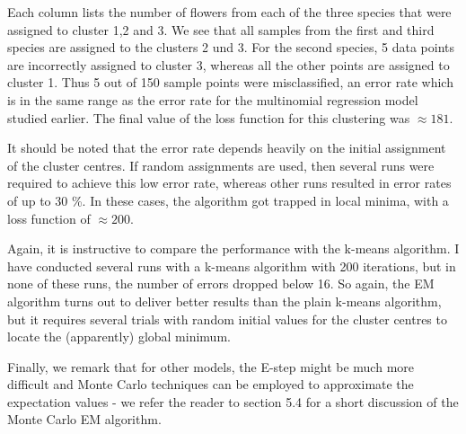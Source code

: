\documentclass[a4paper, draft]{article}
\theoremstyle{own}
\theoremstyle{remark}
\begin{document}
Each column lists the number of flowers from each of the three species that were assigned to cluster 1,2 and 3. We see that all samples from the first and third species are assigned to the clusters 2 und 3. For the second species, 5 data points are incorrectly assigned to cluster 3, whereas all the other points are assigned to cluster 1. Thus 5 out of 150 sample points were misclassified, an error rate which is in the same range as the error rate for the multinomial regression model studied earlier. The final value of the loss function for this clustering was $\approx 181$.

It should be noted that the error rate depends heavily on the initial assignment of the cluster centres. If random assignments are used, then several runs were required to achieve this low error rate, whereas other runs resulted in error rates of up to 30 \%. In these cases, the algorithm got trapped in local minima, with a loss function of $\approx 200$.

Again, it is instructive to compare the performance with the k-means algorithm. I have conducted several runs with a k-means algorithm with 200 iterations, but in none of these runs, the number of errors dropped below 16. So again, the EM algorithm turns out to deliver better results than the plain k-means algorithm, but it requires several trials with random initial values for the cluster centres to locate the (apparently) global minimum. 

Finally, we remark that for other models, the E-step might be much more difficult and Monte Carlo techniques can be employed to approximate the expectation values - we refer the reader to \cite{RobertCasella1999} section 5.4 for a short discussion of the Monte Carlo EM algorithm.




\end{document}
